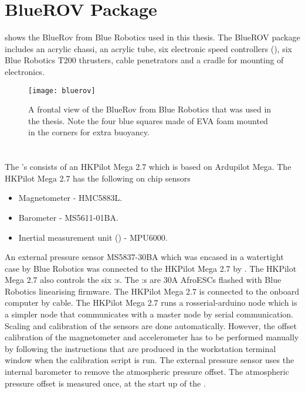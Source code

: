 \section{BlueROV Package}
 shows the BlueRov from Blue Robotics used in this thesis. The BlueROV package includes an acrylic chassi, an acrylic tube, six electronic speed controllers (\abbrECS), six Blue Robotics T200 thrusters, cable penetrators and a cradle for mounting of electronics.
\begin{figure}
\centering
\texttt{[image: bluerov]}
\caption{A frontal view of the BlueRov from Blue Robotics that was used in the thesis.
Note the four blue squares made of EVA foam mounted in the corners for extra buoyancy.}
\label{fig:rov}
\end{figure}

\section{\abbrROV \abbrIO}
The \abbrROV's \abbrIO consists of an HKPilot Mega 2.7 which is based on Ardupilot Mega. The HKPilot Mega 2.7 has the following on chip sensors
\begin{itemize}
    \item Magnetometer - HMC5883L.
    \item Barometer - MS5611-01BA.
    \item Inertial measurement unit (\abbrIMU) - MPU6000.
\end{itemize}
An external pressure sensor MS5837-30BA which was encased in a watertight case by Blue Robotics was connected to the HKPilot Mega 2.7 by \abbrIC.
The HKPilot Mega 2.7 also controls the six \abbrESC:s. The \abbrESC:s are 30A AfroESCs flashed with Blue Robotics linearising firmware. The HKPilot Mega 2.7 is connected to the onboard computer by \abbrUSB cable. The HKPilot Mega 2.7 runs a rosserial-arduino node which is a simpler \abbrROS node that communicates with a master node by serial communication. Scaling and calibration of the sensors are done automatically. However, the offset calibration of the magnetometer and accelerometer has to be performed manually by following the instructions that are produced in the workstation terminal window when the calibration script is run. The external pressure sensor uses the internal barometer to remove the atmospheric pressure offset. The atmospheric pressure offset is measured once, at the start up of the \abbrROV.

